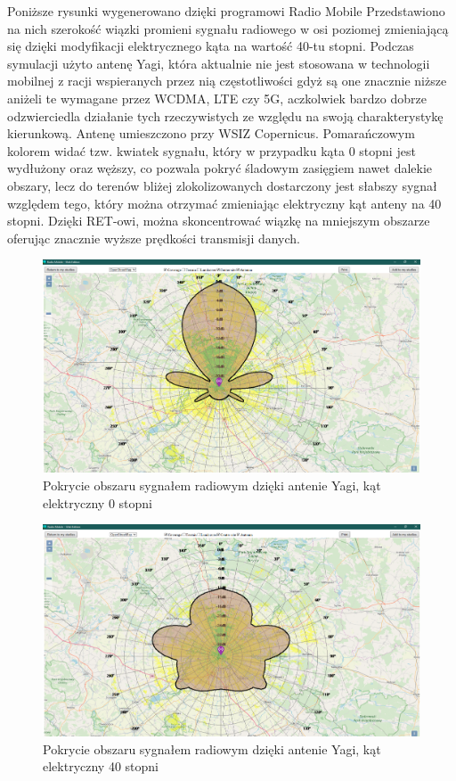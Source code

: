 		Poniższe rysunki wygenerowano dzięki programowi Radio Mobile \autocite{RADIO_MOBILE_PAGE_1}
		Przedstawiono na nich szerokość wiązki promieni sygnału radiowego w osi poziomej \autocite{BEAMWIDTH_1}
		zmieniającą się dzięki modyfikacji elektrycznego kąta na wartość 40-tu stopni.
		Podczas symulacji użyto antenę Yagi, która aktualnie nie jest stosowana w technologii mobilnej z racji wspieranych
		przez nią częstotliwości gdyż są one znacznie niższe aniżeli te wymagane przez WCDMA, LTE czy 5G, 
		aczkolwiek bardzo dobrze odzwierciedla działanie tych rzeczywistych ze względu na swoją charakterystykę kierunkową.
		\newline
		Antenę umieszczono przy WSIZ Copernicus. \newline
		Pomarańczowym kolorem widać tzw. kwiatek sygnału, który w przypadku kąta 0 stopni jest wydłużony oraz węższy,
		co pozwala pokryć śladowym zasięgiem nawet dalekie obszary, lecz do terenów bliżej zlokolizowanych dostarczony
		jest słabszy sygnał względem tego, który można otrzymać zmieniając elektryczny kąt anteny na 40 stopni.
		Dzięki RET-owi, można skoncentrować wiązkę na mniejszym obszarze oferując znacznie wyższe prędkości transmisji danych.

		\begin{figure}[h!]
		\centering
		\includegraphics[scale=0.5]{Obrazki/Antenna_Yagi_Angle_0.png}
		\caption{Pokrycie obszaru sygnałem radiowym dzięki antenie Yagi, kąt elektryczny 0 stopni}
		\end{figure}

		\begin{figure}[h!]
		\centering
		\includegraphics[scale=0.5]{Obrazki/Antenna_Yagi_Angle_40.png}
		\caption{Pokrycie obszaru sygnałem radiowym dzięki antenie Yagi, kąt elektryczny 40 stopni}
		\end{figure}
